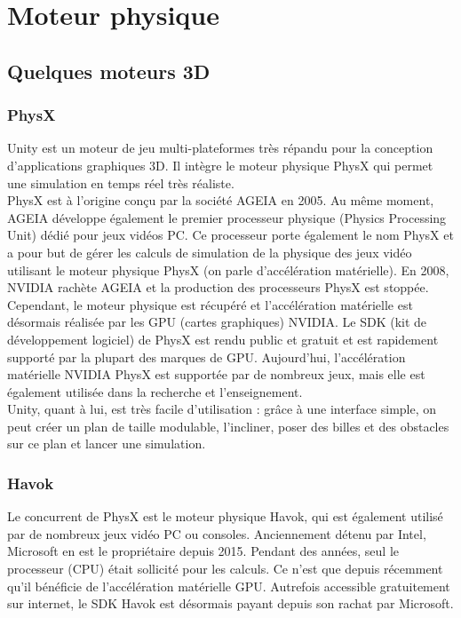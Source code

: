 \documentclass{report}
\begin{document}
\section{Moteur physique}

\subsection{Quelques moteurs 3D}

\subsubsection{PhysX}

Unity est un moteur de jeu multi-plateformes très répandu pour la conception d’applications graphiques 3D. Il intègre le moteur physique PhysX qui permet une simulation en temps réel très réaliste. \\

PhysX est à l’origine conçu par la société AGEIA en 2005. Au même moment, AGEIA développe également le premier processeur physique (Physics Processing Unit) dédié pour jeux vidéos PC. Ce processeur porte également le nom PhysX et a pour but de gérer les calculs de simulation de la physique des jeux vidéo utilisant le moteur physique PhysX (on parle d’accélération matérielle). En 2008, NVIDIA rachète AGEIA et la production des processeurs PhysX est stoppée. Cependant, le moteur physique est récupéré et l’accélération matérielle est désormais réalisée par les GPU (cartes graphiques) NVIDIA. Le SDK (kit de développement logiciel) de PhysX est rendu public et gratuit et est rapidement supporté par la plupart des marques de GPU. Aujourd’hui, l’accélération matérielle NVIDIA PhysX est supportée par de nombreux jeux, mais elle est également utilisée dans la recherche et l’enseignement. \\

	Unity, quant à lui, est très facile d’utilisation : grâce à une interface simple, on peut créer un plan de taille modulable, l’incliner, poser des billes et des obstacles sur ce plan et lancer une simulation.

    
\subsubsection{Havok}

Le concurrent de PhysX est le moteur physique Havok, qui est également utilisé par de nombreux jeux vidéo PC ou consoles. Anciennement détenu par Intel, Microsoft en est le propriétaire depuis 2015. Pendant des années, seul le processeur (CPU) était sollicité pour les calculs. Ce n’est que depuis récemment qu’il bénéficie de l’accélération matérielle GPU. Autrefois accessible gratuitement sur internet, le SDK Havok est désormais payant depuis son rachat par Microsoft.
\end{document}
